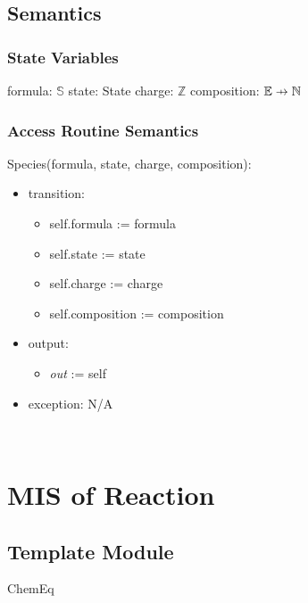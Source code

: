 \documentclass[12pt, titlepage]{article}
\newcommand\pfun{\mathrel{\ooalign{\hfil$\mapstochar\mkern5mu$\hfil\cr$\to$\cr}}}
\begin{document}
\subsection{Semantics}

\subsubsection{State Variables}
formula:  $\mathbb{S}$
\newline state:  State
\newline charge:  $\mathbb{Z}$
\newline composition: $\mathbb{E} \pfun \mathbb{N}$


\subsubsection{Access Routine Semantics}

\noindent Species(formula, state, charge, composition):
\begin{itemize}
\item transition: \begin{itemize} 
                  \item[] self.formula := formula
                  \item[] self.state := state
                  \item[] self.charge := charge
                  \item[] self.composition := composition
                  \end{itemize}
\item output: \begin{itemize} 
              \item[] \emph{out} := self 
              \end{itemize}
\item exception: N/A
\end{itemize}


~\newpage


\section{MIS of Reaction} \label{Module:Reaction}

\subsection{Template Module}

ChemEq
\end{document}
